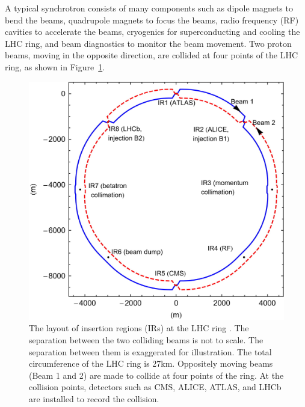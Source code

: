 A typical synchrotron consists of many components such as dipole magnets to bend the beams,
quadrupole magnets to focus the beams, radio frequency (RF) cavities to accelerate
the beams, cryogenics for superconducting and cooling the LHC ring, and beam diagnostics
to monitor the beam movement.
Two proton beams, moving in the opposite direction, are collided at four points of 
the LHC ring, as shown in Figure~\ref{fig:lhcRing}. 
\begin{figure}
  \begin{center}
  \includegraphics[width=0.50\linewidth]{Experiment/LHC/Image/lhc_ring.jpg}
	  \caption{The layout of insertion regions (IRs) at the LHC ring \cite{BRUCE2013825}.
	  The separation between the two colliding beams is not to scale. The 
	  separation between them is exaggerated for illustration. The total circumference
	  of the LHC ring is 27\unit{km}. Oppositely moving beams (Beam 1 and 2) are made 
	  to collide at four points of the ring. At the collision points, detectors such as
	  CMS, ALICE, ATLAS, and LHCb are installed to record the collision.}
  \label{fig:lhcRing}
  \end{center}
\end{figure}

